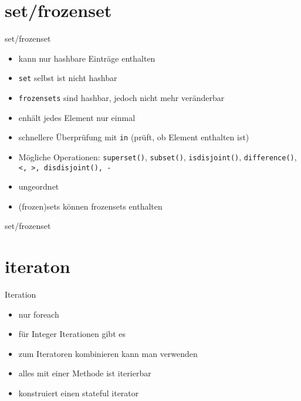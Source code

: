 \section{set/frozenset}
\begin{frame}{set/frozenset}
\begin{itemize}
	\item kann nur hashbare Einträge enthalten
	\item \texttt{set} selbst ist nicht hashbar
	\item \texttt{frozensets} sind hashbar, jedoch nicht mehr veränderbar
	\item enhält jedes Element nur einmal
	\item schnellere Überprüfung mit \texttt{in} (prüft, ob Element enthalten ist)
	\item Mögliche Operationen: \texttt{superset()}, \texttt{subset()}, \texttt{isdisjoint()}, \texttt{difference()}, \texttt{<, >, disdisjoint(), -}
	\item ungeordnet
	\item (frozen)sets können frozensets enthalten
\end{itemize}
\end{frame}
\begin{frame}{set/frozenset}
	
\end{frame}

\section{iteraton}
\begin{frame}{Iteration}
\begin{itemize}
	\item nur foreach
	\item für Integer Iterationen gibt es 
	\item zum Iteratoren kombinieren kann man  verwenden
	\item alles mit einer  Methode ist iterierbar
	\item {} konstruiert einen stateful iterator
\end{itemize}
\end{frame}
\begin{frame}{}
	
\end{frame}
\begin{frame}
	
\end{frame}

